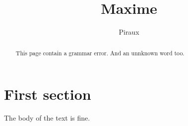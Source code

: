 \documentclass[]{article}
\title{Maxime}
\author{Piraux}
\begin{document}
\maketitle

\begin{abstract}
This page contain a grammar error.
And an unnknown word too.
\end{abstract}

\section{First section}
The body of the text is fine.
\end{document}
